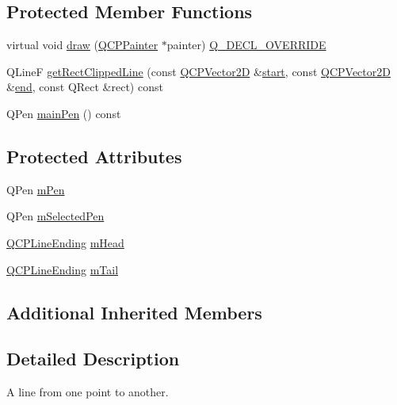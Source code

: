 \subsection*{Protected Member Functions}
\begin{DoxyCompactItemize}
\item 
virtual void \hyperlink{class_q_c_p_item_line_ae184140b61b2ef5b8edde76304447200}{draw} (\hyperlink{class_q_c_p_painter}{Q\+C\+P\+Painter} $\ast$painter) \hyperlink{qcustomplot_8h_a42cc5eaeb25b85f8b52d2a4b94c56f55}{Q\+\_\+\+D\+E\+C\+L\+\_\+\+O\+V\+E\+R\+R\+I\+DE}
\item 
Q\+LineF \hyperlink{class_q_c_p_item_line_a7b00a1d82be8b961461cc4039acd12a3}{get\+Rect\+Clipped\+Line} (const \hyperlink{class_q_c_p_vector2_d}{Q\+C\+P\+Vector2D} \&\hyperlink{class_q_c_p_item_line_a602da607a09498b0f152ada1d6851bc5}{start}, const \hyperlink{class_q_c_p_vector2_d}{Q\+C\+P\+Vector2D} \&\hyperlink{class_q_c_p_item_line_a15598864c1c22a2497a1979c4980c4e1}{end}, const Q\+Rect \&rect) const
\item 
Q\+Pen \hyperlink{class_q_c_p_item_line_af8b5370462515b279578d8b4a57bd3b4}{main\+Pen} () const
\end{DoxyCompactItemize}
\subsection*{Protected Attributes}
\begin{DoxyCompactItemize}
\item 
Q\+Pen \hyperlink{class_q_c_p_item_line_abbb544d5bb927dfe4e81a7f3ca4c65ac}{m\+Pen}
\item 
Q\+Pen \hyperlink{class_q_c_p_item_line_aff858ad6dde3b90024814ca4b116f278}{m\+Selected\+Pen}
\item 
\hyperlink{class_q_c_p_line_ending}{Q\+C\+P\+Line\+Ending} \hyperlink{class_q_c_p_item_line_a51603f28ab7ddb1c1a95ea384791d3ed}{m\+Head}
\item 
\hyperlink{class_q_c_p_line_ending}{Q\+C\+P\+Line\+Ending} \hyperlink{class_q_c_p_item_line_ab8ed61dfe15bbb1cbf9b95eae95e242f}{m\+Tail}
\end{DoxyCompactItemize}
\subsection*{Additional Inherited Members}


\subsection{Detailed Description}
A line from one point to another. 

